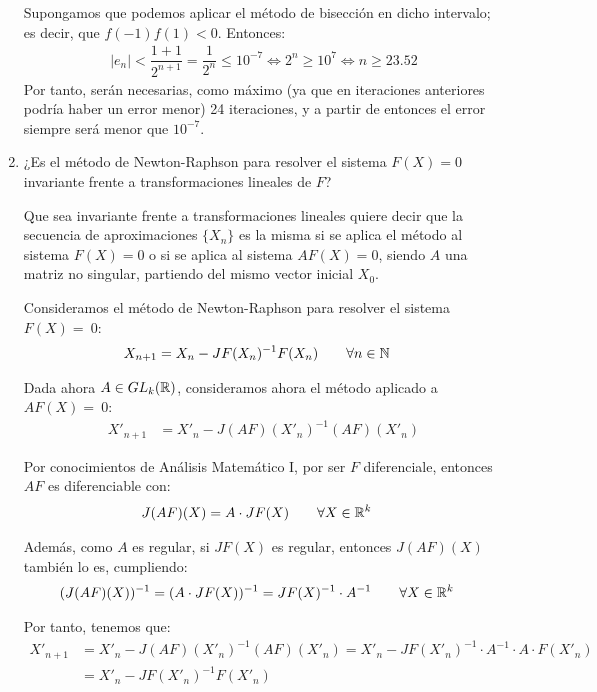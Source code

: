 \begin{ejercicio}
\begin{enumerate}
        Supongamos que podemos aplicar el método de bisección en dicho intervalo; es decir, que $f(-1)f(1)<0$. Entonces:
        \begin{align*}
            |e_n| < \dfrac{1+1}{2^{n+1}} = \dfrac{1}{2^n}\leq10^{-7}
            \iff 2^n\geq 10^7\iff n\geq 23.52
        \end{align*}
        Por tanto, serán necesarias, como máximo (ya que en iteraciones anteriores podría haber un error menor) 24 iteraciones, y a partir de entonces el error siempre será menor que $10^{-7}$.
        \item ¿Es el método de Newton-Raphson para resolver el sistema $F(X) = 0$ invariante frente a transformaciones lineales de $F$?
        \begin{observacion}
            Que sea invariante frente a transformaciones lineales quiere decir que la secuencia de aproximaciones $\{X_n\}$ es la misma si se aplica el método al sistema $F(X) = 0$ o si se aplica al sistema $AF(X) = 0$, siendo $A$ una matriz no singular, partiendo del mismo vector inicial $X_0$.
        \end{observacion}

        Consideramos el método de Newton-Raphson para resolver el sistema $F(X) = ~0$:
        \begin{align*}
            X_{n+1} &= X_n - JF(X_n)^{-1}F(X_n)\qquad \forall n\in \mathbb{N}
        \end{align*}

        Dada ahora $A\in GL_k(\mathbb{R})$, consideramos ahora el método aplicado a $AF(X) =~0$:
        \begin{align*}
            X'_{n+1} &= X'_n - J(AF)(X'_n)^{-1}(AF)(X'_n)
        \end{align*}

        Por conocimientos de Análisis Matemático I, por ser $F$ diferenciale, entonces $AF$ es diferenciable con:
        \begin{align*}
            J(AF)(X) &= A\cdot JF(X)\qquad \forall X\in \mathbb{R}^k
        \end{align*}

        Además, como $A$ es regular, si $JF(X)$ es regular, entonces $J(AF)(X)$ también lo es, cumpliendo:
        \begin{align*}
            (J(AF)(X))^{-1} &= (A\cdot JF(X))^{-1} = JF(X)^{-1}\cdot A^{-1}\qquad \forall X\in \mathbb{R}^k
        \end{align*}

        Por tanto, tenemos que:
        \begin{align*}
            X'_{n+1} &= X'_n - J(AF)(X'_n)^{-1}(AF)(X'_n)
            = X'_n -JF(X'_n)^{-1}\cdot A^{-1}\cdot A\cdot F(X'_n)\\
            &= X'_n - JF(X'_n)^{-1}F(X'_n)
        \end{align*}


\end{enumerate}
\end{ejercicio}
